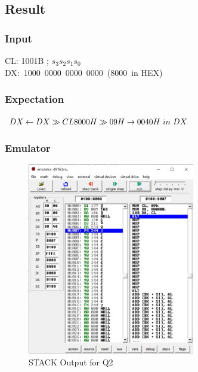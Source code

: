 \documentclass{article}
\begin{document}
\subsection{Result}
\subsubsection{Input}
 CL: 1001B ; $s_3 s_2 s_1 s_0 $ \\
 DX:\ 1000\ 0000\ 0000\ 0000\ (8000\ in HEX)
 
\subsubsection{Expectation}
$
DX \leftarrow DX \gg CL \\
8000H \gg 09H \rightarrow 0040H\ in\ DX 
$ 


\subsubsection{Emulator}
\begin{figure}[h]
\begin{center}
\includegraphics[width=0.65\textwidth]{4x16_OUT} 
\caption{STACK Output for Q2}
\end{center}
\end{figure}
\end{document}
